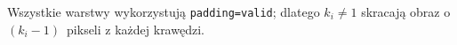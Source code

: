 \documentclass[11pt]{article}
\begin{document}
Wszystkie warstwy wykorzystują \texttt{padding=valid};
dlatego \(k_i\neq1\) skracają obraz o \((k_i-1)\)~pikseli z każdej
krawędzi.  





\end{document}
